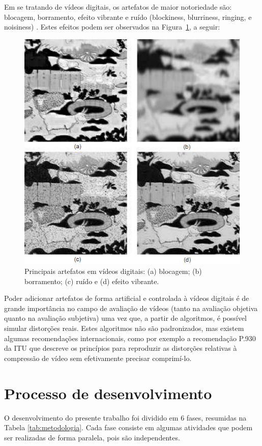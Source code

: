 Em se tratando de vídeos digitais, os artefatos de maior notoriedade são: blocagem, borramento, efeito vibrante e ruído (blockiness, blurriness, ringing, e noisiness) \cite{farias2007}. Estes efeitos podem ser observados na Figura~\ref{fig:artefatosdigitais}, a seguir:

\begin{figure}[!htb]
	\centering
	\includegraphics[scale=0.45]{./imgs/figura1.png}
	\caption{Principais artefatos em vídeos digitais: (a) blocagem; (b) borramento; (c) ruído e (d) efeito vibrante.}
	\label{fig:artefatosdigitais}
\end{figure}


Poder adicionar artefatos de forma artificial e controlada à vídeos digitais é de grande importância no campo de avaliação de vídeos (tanto na avaliação objetiva quanto na avaliação subjetiva) uma vez que, a partir de algoritmos, é possível simular distorções reais. Estes algoritmos não são padronizados, mas existem algumas recomendações internacionais, como por exemplo a recomendação P.930 da ITU \cite{itup930} que descreve os princípios para reproduzir as distorções relativas à compressão de vídeo sem efetivamente precisar comprimí-lo.

\section{Processo de desenvolvimento}
O desenvolvimento do presente trabalho foi dividido em 6 fases, resumidas na Tabela \ref{tab:metodologia}. Cada fase consiste em algumas atividades que podem ser realizadas de forma paralela, pois são independentes.

